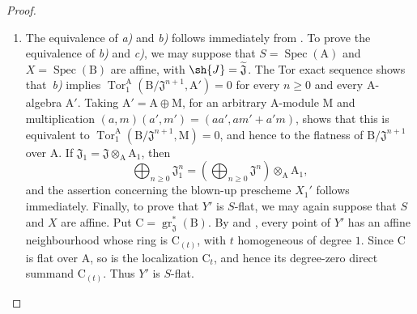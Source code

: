 \begin{proof}
\begin{enumerate}[label=(\roman*)]
  \item The equivalence of \emph{a)} and \emph{b)} follows immediately from . To prove the equivalence of \emph{b)} and \emph{c)}, we may suppose that $S=\operatorname{Spec}(\mathrm{A})$ and $X=\operatorname{Spec}(\mathrm{B})$ are affine, with $\sh{J}=\widetilde{\mathfrak{J}}$. The Tor exact sequence shows that~\emph{b)} implies $\operatorname{Tor}_1^{\mathrm{A}}(\mathrm{B}/\mathfrak{J}^{n+1},\mathrm{A}')=0$ for every $n\geq0$ and every $\mathrm{A}$-algebra $\mathrm{A}'$. Taking $\mathrm{A}'=\mathrm{A}\oplus\mathrm{M}$, for an arbitrary $\mathrm{A}$-module $\mathrm{M}$ and multiplication $(a,m)(a',m')=(aa',am'+a'm)$, shows that this is equivalent to $\operatorname{Tor}_1^{\mathrm{A}}(\mathrm{B}/\mathfrak{J}^{n+1},\mathrm{M})=0$, and hence to the flatness of $\mathrm{B}/\mathfrak{J}^{n+1}$ over $\mathrm{A}$.
If $\mathfrak{J}_1=\mathfrak{J}\otimes_{\mathrm{A}}\mathrm{A}_1$, then
\[
  \bigoplus_{n\geq0}\mathfrak{J}_1^n=\left(\bigoplus_{n\geq0}\mathfrak{J}^n\right)\otimes_{\mathrm{A}}\mathrm{A}_1,
\]
and the assertion concerning the blown-up prescheme $X_1'$ follows immediately.
Finally, to prove that $Y'$ is $S$-flat, we may again suppose that $S$ and $X$ are affine. Put $\mathrm{C}=\operatorname{gr}_\mathfrak{J}^*(\mathrm{B})$. By  and , every point of $Y'$ has an affine neighbourhood whose ring is $\mathrm{C}_{(t)}$, with $t$ homogeneous of degree $1$. Since $\mathrm{C}$ is flat over $\mathrm{A}$, so is the localization $\mathrm{C}_t$, and hence its degree-zero direct summand $\mathrm{C}_{(t)}$. Thus $Y'$ is $S$-flat.


\end{enumerate}
\end{proof}
